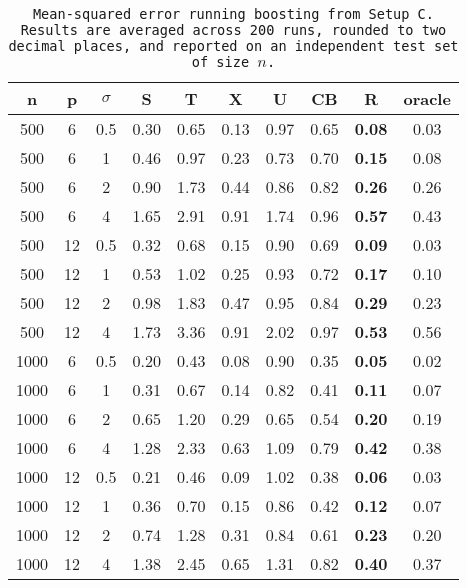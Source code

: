 \begin{table}[ht]
\centering
\begin{tabular}{cccccccccc}
  \hline
n & p & $\sigma$ & S & T & X & U & CB & R & oracle \\ 
  \hline
500 & 6 & 0.5 & 0.30 & 0.65 & 0.13 & 0.97 & 0.65 & \bf 0.08 & 0.03 \\ 
  500 & 6 & 1 & 0.46 & 0.97 & 0.23 & 0.73 & 0.70 & \bf 0.15 & 0.08 \\ 
  500 & 6 & 2 & 0.90 & 1.73 & 0.44 & 0.86 & 0.82 & \bf 0.26 & 0.26 \\ 
  500 & 6 & 4 & 1.65 & 2.91 & 0.91 & 1.74 & 0.96 & \bf 0.57 & 0.43 \\ 
  500 & 12 & 0.5 & 0.32 & 0.68 & 0.15 & 0.90 & 0.69 & \bf 0.09 & 0.03 \\ 
  500 & 12 & 1 & 0.53 & 1.02 & 0.25 & 0.93 & 0.72 & \bf 0.17 & 0.10 \\ 
  500 & 12 & 2 & 0.98 & 1.83 & 0.47 & 0.95 & 0.84 & \bf 0.29 & 0.23 \\ 
  500 & 12 & 4 & 1.73 & 3.36 & 0.91 & 2.02 & 0.97 & \bf 0.53 & 0.56 \\ 
  1000 & 6 & 0.5 & 0.20 & 0.43 & 0.08 & 0.90 & 0.35 & \bf 0.05 & 0.02 \\ 
  1000 & 6 & 1 & 0.31 & 0.67 & 0.14 & 0.82 & 0.41 & \bf 0.11 & 0.07 \\ 
  1000 & 6 & 2 & 0.65 & 1.20 & 0.29 & 0.65 & 0.54 & \bf 0.20 & 0.19 \\ 
  1000 & 6 & 4 & 1.28 & 2.33 & 0.63 & 1.09 & 0.79 & \bf 0.42 & 0.38 \\ 
  1000 & 12 & 0.5 & 0.21 & 0.46 & 0.09 & 1.02 & 0.38 & \bf 0.06 & 0.03 \\ 
  1000 & 12 & 1 & 0.36 & 0.70 & 0.15 & 0.86 & 0.42 & \bf 0.12 & 0.07 \\ 
  1000 & 12 & 2 & 0.74 & 1.28 & 0.31 & 0.84 & 0.61 & \bf 0.23 & 0.20 \\ 
  1000 & 12 & 4 & 1.38 & 2.45 & 0.65 & 1.31 & 0.82 & \bf 0.40 & 0.37 \\ 
   \hline
\end{tabular}
\caption{\tt Mean-squared error running \texttt{boosting} from Setup C. Results are averaged across 200 runs, rounded to two decimal places, and reported on an independent test set of size $n$.} 
\label{table:setup3}
\end{table}
